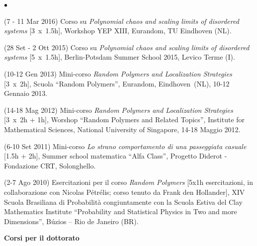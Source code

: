\documentclass[a4paper,11pt,oneside]{amsart}
\newenvironment{myitemize}{%
\begin{list}{$\bullet$}%
 	{%
	\setlength{\itemsep}{0.3em}%
	\setlength{\topsep}{0.3em}%
	\setlength{\partopsep}{0em}%
	\setlength{\parsep}{0em}%
	\setlength{\parskip}{0em}%
	\setlength\leftmargin{1.5em}%
	\setlength\labelwidth{1.1em}%
	\setlength{\labelsep}{0.4em}%
	}%
	}%
{\end{list}}
\renewenvironment{itemize}{
\begin{myitemize}}%
{\end{myitemize}}
\begin{document}
\begin{itemize}
\item (7 - 11 Mar 2016)
Corso su \emph{Polynomial chaos and scaling limits of disordered systems} [3~x~1.5h],
Workshop YEP XIII, Eurandom, TU Eindhoven (NL).

\item (28 Set - 2 Ott 2015)
Corso su \emph{Polynomial chaos and scaling limits of disordered systems} [5~x~1.5h],
Berlin-Potsdam Summer School 2015, Levico Terme (I).

\item (10-12 Gen 2013)
Mini-corso \emph{Random Polymers and Localization Strategies} [3~x~2h],
Scuola ``Random Polymers'', Eurandom, Eindhoven~(NL),
10-12 Gennaio 2013.

\item (14-18 Mag 2012)
Mini-corso \emph{Random Polymers and Localization Strategies} [3~x~2h + 1h],
Worshop ``Random Polymers and Related Topics'', Institute for Mathematical Sciences,
National University of Singapore, 14-18 Maggio 2012.

\item (6-10 Set 2011)
Mini-corso \emph{Lo strano comportamento di una passeggiata casuale} [1.5h + 2h],
Summer school matematica ``Alfa Class'', Progetto Diderot - Fondazione CRT,
Solonghello.

\item (2-7 Ago 2010)
Esercitazioni per il corso \emph{Random Polymers} 
[5x1h esercitazioni, in collaborazione con Nicolas Pétrélis;
corso tenuto da Frank den Hollander],
XIV Scuola Brasiliana di Probabilità congiuntamente con la 
Scuola Estiva del Clay Mathematics Institute
``Probability and Statistical Physics in Two and more Dimensions'',
B\'uzios -- Rio de Janeiro (BR).
\end{itemize}


\medskip
{\large\sf \bfseries Corsi per il dottorato}
\smallskip
\end{document}
